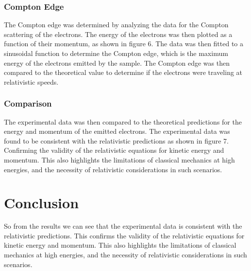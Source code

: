 \documentclass[12pt]{article}
\begin{document}
                \subsubsection{Compton Edge}
                The Compton edge was determined by analyzing the data for the Compton scattering of the electrons. 
                The energy of the electrons was then plotted as a function of their momentum, as shown in figure 6. 
                The data was then fitted to a sinusoidal function to determine the Compton edge, which is the maximum 
                energy of the electrons emitted by the sample. The Compton edge was then compared to the theoretical 
                value to determine if the electrons were traveling at relativistic speeds.

                \subsubsection{Comparison}
                The experimental data was then compared to the theoretical predictions for the energy and momentum of the 
                emitted electrons. The experimental data was found to be consistent with the relativistic predictions as shown in figure 7. 
                Confirming the validity of the relativistic equations for kinetic energy and momentum. This also highlights 
                the limitations of classical mechanics at high energies, and the necessity of relativistic considerations in such scenarios.
        





\section{Conclusion}
        So from the results we can see that the experimental data is consistent with the relativistic predictions. This confirms the validity of the relativistic equations for kinetic energy and momentum. This also highlights the limitations of classical mechanics at high energies, and the necessity of relativistic considerations in such scenarios.
\end{document}

